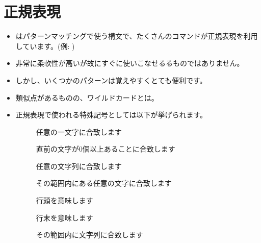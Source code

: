 \documentclass{jsarticle}
\begin{document}
\section{正規表現}


\begin{itemize}

\item {\color{red}{\bf 正規表現}}はパターンマッチングで使う構文で、たくさんのコマンドが正規表現を利用しています。(例: {\color{red}})
\item 非常に柔軟性が高いが故にすぐに使いこなせるるものではありません。
\item しかし、いくつかのパターンは覚えやすくとても便利です。
\item 類似点があるものの、ワイルドカードとは{\color{red}{\bf 異なります}}。
\item 正規表現で使われる特殊記号としては以下が挙げられます。

\begin{description}
\item[{\color{red}{\tt .}}] 任意の一文字に合致します
\item[{\color{red}{\tt *}}] 直前の文字が0個以上あることに合致します
\item[{\color{red}{\tt .*}}] 任意の文字列に合致します
\item[{\color{red}{\tt \Q{[ ]}}}] その範囲内にある任意の文字に合致します 
\item[{\color{red}{\tt \Q{^}}}] 行頭を意味します
\item[{\color{red}{\tt \$}}] 行末を意味します
\item[{\color{red}{\tt \Q{[^ ]}}}] その範囲内に{\color{red}{\bf ない}}文字列に合致します
\end{description}
\end{itemize}
\end{document}
